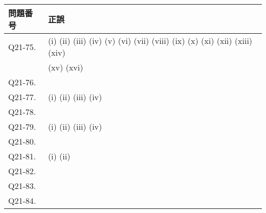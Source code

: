 \documentclass[uplatex,dvipdfmx,a4paper,11pt]{jlreq}
\numberwithin{equation}{section}
\theoremstyle{definition}
\begin{document}
\begin{table}[hbtp]
  \label{table:data_type}
  \centering
  \begin{tabular}{ll}
    \hline
    問題番号     & 正誤                                                                                                                                                             \\
    \hline \hline
    Q21-75.  & (i) \quad (ii) \quad (iii) \quad (iv) \quad (v) \quad (vi) \quad (vii) \quad (viii) \quad (ix) \quad (x) \quad (xi) \quad (xii) \quad (xiii) \quad (xiv) \quad \\
             & (xv) \quad (xvi) \quad                                                                                                                                         \\
    Q21-76.  & \quad                                                                                                                                                          \\
    Q21-77.  & (i) \quad (ii) \quad (iii) \quad (iv) \quad                                                                                                                    \\
    Q21-78.  & \quad                                                                                                                                                          \\
    Q21-79.  & (i) \quad (ii) \quad (iii) \quad (iv) \quad                                                                                                                    \\
    Q21-80.  & \quad                                                                                                                                                          \\
    Q21-81.  & (i) \quad (ii) \quad                                                                                                                                           \\
    Q21-82.  & \quad                                                                                                                                                          \\
    Q21-83.  & \quad                                                                                                                                                          \\
    Q21-84.  & \quad                                                                                                                                                          \\

\end{tabular}
\end{table}
\end{document}
